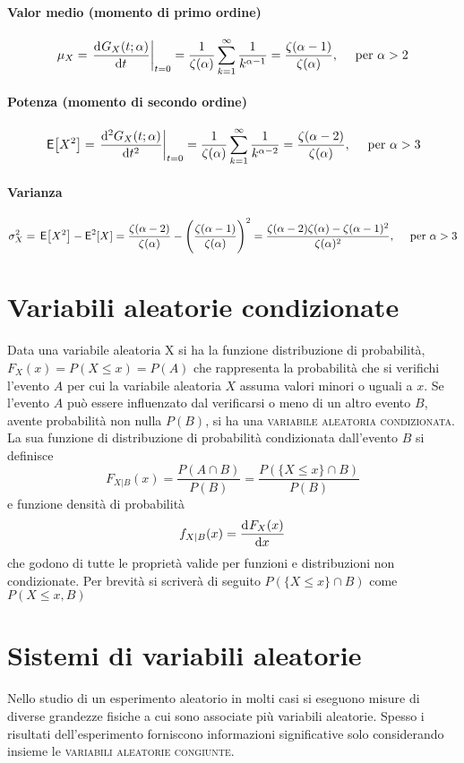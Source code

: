 \paragraph{Valor medio (momento di primo ordine)}
\[
	\mu_X = \left.{\dfrac{\mathop{}\!\mathrm{d}^{}G_X(t;\alpha)}{\mathop{}\!\mathrm{d} t^{}}}\right\rvert_{t=0} =
	\frac{1}{\zeta(\alpha)} \sum_{k=1}^\infty \frac{1}{k^{\alpha-1}} =
	\frac{\zeta(\alpha-1)}{\zeta(\alpha)},
	\quad \text{ per } \alpha > 2
\]

\paragraph{Potenza (momento di secondo ordine)}
\[
	\,{\operatorname{\mathsf{E}}}\!\left[{X^2}\right] = \left.{\frac{\mathrm{d}^2 G_X(t;\alpha)}{\mathrm{d}t^2}}\right\rvert_{t=0} =
	\frac{1}{\zeta(\alpha)} \sum_{k=1}^\infty \frac{1}{k^{\alpha -2}} =
	\frac{\zeta(\alpha -2)}{\zeta(\alpha)},
	\quad \text{ per } \alpha > 3
\]

\paragraph{Varianza}
\[
	\sigma_X^2 = \,{\operatorname{\mathsf{E}}}\!\left[{X^2}\right] - \operatorname{\mathsf{E}}^2[X] =
	\frac{\zeta(\alpha -2)}{\zeta(\alpha)} - \Biggl(\frac{\zeta(\alpha-1)}{\zeta(\alpha)}\Biggr)^2 =
	\frac{\zeta(\alpha-2)\zeta(\alpha) - \zeta(\alpha-1)^2}{\zeta(\alpha)^2},
	\quad \text{ per } \alpha > 3
\]

\section{Variabili aleatorie condizionate}
Data una variabile aleatoria X si ha la funzione distribuzione di probabilità, $F_X(x)=P(X\leq x)=P(A)$ che rappresenta la probabilità che si verifichi l'evento $A$ per cui la variabile aleatoria $X$ assuma valori minori o uguali a $x$.
Se l'evento $A$ può essere influenzato dal verificarsi o meno di un altro evento $B$, avente probabilità non nulla $P(B)$, si ha una \textsc{variabile aleatoria condizionata}.
La sua funzione di distribuzione di probabilità condizionata dall'evento $B$ si definisce
\begin{equation}
F_{X|B}(x)=\frac{P(A\cap B)}{P(B)}=\frac{P(\lbrace X\leq x\rbrace\cap B)}{P(B)}
\end{equation}
e funzione densità di probabilità
\[f_{X|B}(x)=\dfrac{\mathop{}\!\mathrm{d}^{}F_X(x)}{\mathop{}\!\mathrm{d} x^{}}\]
che godono di tutte le proprietà valide per funzioni e distribuzioni non condizionate.
Per brevità si scriverà di seguito $P(\lbrace X\leq x\rbrace\cap B)$ come $P(X\leq x, B)$

\section{Sistemi di variabili aleatorie}
Nello studio di un esperimento aleatorio in molti casi si eseguono misure di diverse grandezze fisiche a cui sono associate più variabili aleatorie. Spesso i risultati dell'esperimento forniscono informazioni significative solo considerando insieme le \textsc{variabili aleatorie congiunte}.

